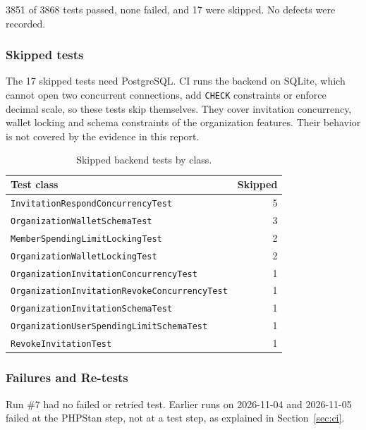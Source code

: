3851 of 3868 tests passed, none failed, and 17 were skipped.
No defects were recorded.

\subsubsection*{Skipped tests}

The 17 skipped tests need PostgreSQL\@.
CI runs the backend on SQLite, which cannot open two concurrent connections, add \texttt{CHECK} constraints or enforce decimal scale, so these tests skip themselves.
They cover invitation concurrency, wallet locking and schema constraints of the organization features.
Their behavior is not covered by the evidence in this report.

\begin{table}[H]
  \centering
  \begin{tabularx}{\linewidth}{Yr}
    \toprule
    Test class & Skipped \\
    \midrule
    \texttt{InvitationRespondConcurrencyTest} & 5 \\
    \texttt{OrganizationWalletSchemaTest} & 3 \\
    \texttt{MemberSpendingLimitLockingTest} & 2 \\
    \texttt{OrganizationWalletLockingTest} & 2 \\
    \texttt{OrganizationInvitationConcurrencyTest} & 1 \\
    \texttt{OrganizationInvitationRevokeConcurrencyTest} & 1 \\
    \texttt{OrganizationInvitationSchemaTest} & 1 \\
    \texttt{OrganizationUserSpendingLimitSchemaTest} & 1 \\
    \texttt{RevokeInvitationTest} & 1 \\
    \bottomrule
  \end{tabularx}
  \caption{Skipped backend tests by class.}
  \label{tab:skipped-sprint2}
\end{table}

\subsubsection*{Failures and Re-tests}

Run \#7 had no failed or retried test.
Earlier runs on 2026-11-04 and 2026-11-05 failed at the PHPStan step, not at a test step, as explained in Section~\ref{sec:ci}.
